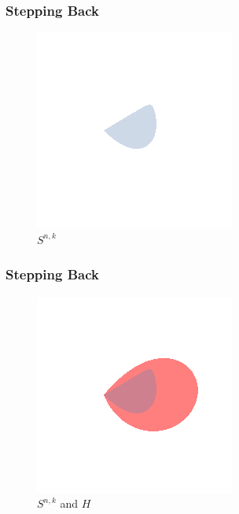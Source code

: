 \documentclass{beamer}
\begin{document}
\begin{frame}
    \frametitle{Stepping Back}
    \begin{figure}[h]
        \centering
        \includegraphics[width=0.6\linewidth]{just_snk.png}
        \caption{$S^{n,k}$}%
        \label{fig:just_snk}
    \end{figure}
\end{frame}
\begin{frame}
    \frametitle{Stepping Back}
    \begin{figure}[h]
        \centering
        \includegraphics[width=0.6\linewidth]{comparison.png}
        \caption{$S^{n,k}$ and $H$}%
        \label{fig:just_snk}
    \end{figure}
\end{frame}
\end{document}
